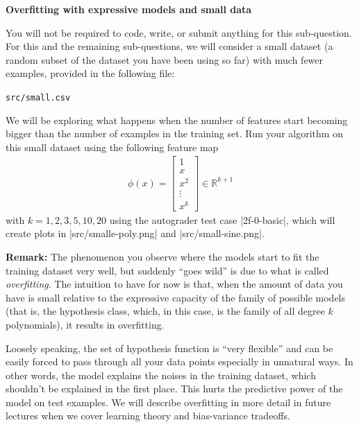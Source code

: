 \item {} {\bf Overfitting with expressive models and small data}

You will not be required to code, write, or submit anything for this sub-question.  For this and the remaining sub-questions, we will consider a small
dataset (a random subset of the dataset you have been using so far) with much fewer examples, provided in
the following file:
%
\begin{center}
	\texttt{src/small.csv}
\end{center}
%

We will be exploring what happens when the number of features start becoming bigger than the number of 
examples in the training set. Run your algorithm on this small dataset using the following feature map 
\begin{align}
\phi(x) = \left[\begin{array}{c} 1\\ x \\ x^2\\ \vdots \\x^k \end{array}\right]\in \mathbb{R}^{k+1} 
\end{align}
with $k = 1,2,3,5,10,20$ using the autograder test case |2f-0-basic|, which will create plots in |src/smalle-poly.png| and |src/small-sine.png|. 

\textbf{Remark: } The phenomenon you observe where the models start to fit the training dataset very well, but suddenly ``goes wild'' is due to what is called \emph{overfitting}. The intuition to have for now is that, when the amount of data you have is small relative to the expressive capacity of the family of possible models (that is, the hypothesis class, which, in this case, is the family of all degree $k$ polynomials), it results in overfitting.  

Loosely speaking, the set of hypothesis function is ``very flexible'' and can be easily forced to pass through all your data points especially in unnatural ways. In other words, the  model explains the noises in the training dataset, which shouldn't be explained in the first place. This hurts the predictive power of the model on test examples. We will describe overfitting in more detail in future lectures when we cover learning theory and bias-variance tradeoffs.\\

